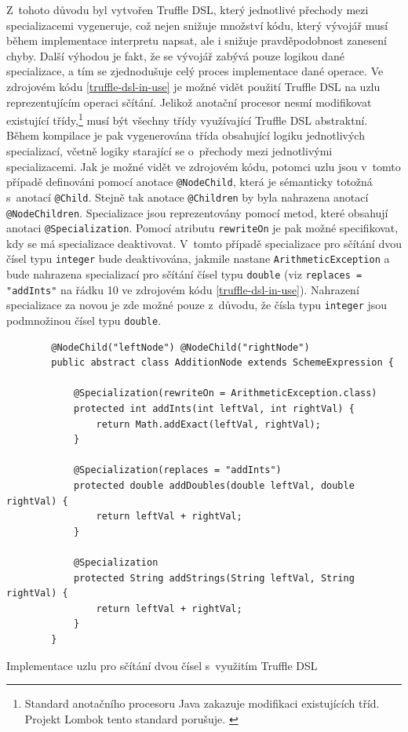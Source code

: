 \documentclass[
  master,
  biblatex,
  figures=true,
  theorems,
  sourcecodes,
  glossaries,
  index
]{kidiplom}
\begin{document}
Z~tohoto důvodu byl vytvořen Truffle DSL, který jednotlivé přechody mezi specializacemi vygeneruje, což nejen snižuje množství kódu, který vývojář musí během implementace interpretu napsat, ale i snižuje pravděpodobnost zanesení chyby. Další výhodou je fakt, že se vývojář zabývá pouze logikou dané specializace, a tím se zjednodušuje celý proces implementace dané operace. Ve zdrojovém kódu \ref{truffle-dsl-in-use} je možné vidět použití Truffle DSL na uzlu reprezentujícím operaci sčítání. Jelikož anotační procesor nesmí modifikovat existující třídy,\footnote{Standard anotačního procesoru Java zakazuje modifikaci existujících tříd. Projekt Lombok tento standard porušuje. \cite{lombok-adam-ruka}} musí být všechny třídy využívající Truffle DSL abstraktní. Během kompilace je pak vygenerována třída obsahující logiku jednotlivých specializací, včetně logiky starající se o~přechody mezi jednotlivými specializacemi. Jak je možné vidět ve zdrojovém kódu, potomci uzlu jsou v~tomto případě definováni pomocí anotace \texttt{@NodeChild}, která je sémanticky totožná s~anotací \texttt{@Child}. Stejně tak anotace \texttt{@Children} by byla nahrazena anotací \texttt{@NodeChildren}. Specializace jsou reprezentovány pomocí metod, které obsahují anotaci \texttt{@Specialization}. Pomocí atributu \texttt{rewriteOn} je pak možné specifikovat, kdy se má specializace deaktivovat. V~tomto případě specializace pro sčítání dvou čísel typu \texttt{integer} bude deaktivována, jakmile nastane \texttt{ArithmeticException} a bude nahrazena specializací pro sčítání čísel typu \texttt{double} (viz \texttt{replaces = "addInts"} na řádku 10 ve zdrojovém kódu \ref{truffle-dsl-in-use}). Nahrazení specializace za novou je zde možné pouze z~důvodu, že čísla typu \texttt{integer} jsou podmnožinou čísel typu \texttt{double}.


\begin{listing} 
    \begin{verbatim}
        @NodeChild("leftNode") @NodeChild("rightNode")
        public abstract class AdditionNode extends SchemeExpression {
        
            @Specialization(rewriteOn = ArithmeticException.class)
            protected int addInts(int leftVal, int rightVal) {
                return Math.addExact(leftVal, rightVal);
            }
        
            @Specialization(replaces = "addInts")
            protected double addDoubles(double leftVal, double rightVal) {
                return leftVal + rightVal;
            }
        
            @Specialization
            protected String addStrings(String leftVal, String rightVal) {
                return leftVal + rightVal;
            }
        }
    \end{verbatim}
    \caption{Implementace uzlu pro sčítání dvou čísel s~využitím Truffle DSL}
    \label{truffle-dsl-in-use}
\end{listing}
\end{document}
